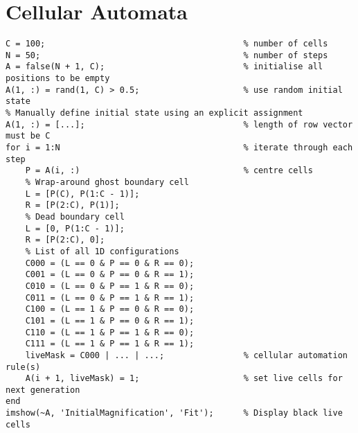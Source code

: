 \documentclass{article}
\begin{document}
\section*{Cellular Automata}
\begin{verbatim}
C = 100;                                        % number of cells
N = 50;                                         % number of steps
A = false(N + 1, C);                            % initialise all positions to be empty
A(1, :) = rand(1, C) > 0.5;                     % use random initial state
% Manually define initial state using an explicit assignment
A(1, :) = [...];                                % length of row vector must be C
for i = 1:N                                     % iterate through each step
    P = A(i, :)                                 % centre cells
    % Wrap-around ghost boundary cell
    L = [P(C), P(1:C - 1)];
    R = [P(2:C), P(1)];
    % Dead boundary cell
    L = [0, P(1:C - 1)];
    R = [P(2:C), 0];
    % List of all 1D configurations
    C000 = (L == 0 & P == 0 & R == 0);
    C001 = (L == 0 & P == 0 & R == 1);
    C010 = (L == 0 & P == 1 & R == 0);
    C011 = (L == 0 & P == 1 & R == 1);
    C100 = (L == 1 & P == 0 & R == 0);
    C101 = (L == 1 & P == 0 & R == 1);
    C110 = (L == 1 & P == 1 & R == 0);
    C111 = (L == 1 & P == 1 & R == 1);
    liveMask = C000 | ... | ...;                % cellular automation rule(s)
    A(i + 1, liveMask) = 1;                     % set live cells for next generation
end
imshow(~A, 'InitialMagnification', 'Fit');      % Display black live cells
\end{verbatim}
\end{document}
